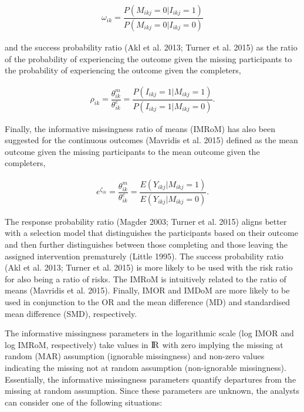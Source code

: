 \[\begin{aligned}
\omega_{ik} = \dfrac{P(M_{ikj} = 0 | I_{ikj} = 1)}{P(M_{ikj} = 0 | I_{ikj} = 0)}
\end{aligned}\]

and the success probability ratio (Akl et al. 2013; Turner et al. 2015) as the ratio of the
probability of experiencing the outcome given the missing participants to the
probability of experiencing the outcome given the completers,

\[\begin{aligned}
\rho_{ik} = \dfrac{\theta^{m}_{ik}}{\theta^{c}_{ik}} = \dfrac{P(I_{ikj} = 1 | M_{ikj} = 1)}{P(I_{ikj} = 1 | M_{ikj} = 0)}.
\end{aligned}\]

Finally, the informative missingness ratio of means (IMRoM) has also been suggested
for the continuous outcomes (Mavridis et al. 2015) defined as the mean outcome given the
missing participants to the mean outcome given the completers,

\[\begin{aligned}
e^{\zeta_{ik}} = \dfrac{\theta^{m}_{ik}}{\theta^{c}_{ik}} = \dfrac{E(Y_{ikj} | M_{ikj} = 1)}{E(Y_{ikj} | M_{ikj} = 0)}.
\end{aligned}\]

The response probability ratio (Magder 2003; Turner et al. 2015) aligns better with a
selection model that distinguishes the participants based on their outcome and
then further distinguishes between those completing and those leaving the assigned
intervention prematurely (Little 1995). The success probability ratio (Akl et al. 2013; Turner et al. 2015) is more likely to be used with the risk ratio for also being a ratio
of risks. The IMRoM is intuitively related to the ratio of means (Mavridis et al. 2015).
Finally, IMOR and IMDoM are more likely to be used in conjunction to the OR and
the mean difference (MD) and standardised mean difference (SMD), respectively.

The informative missingness parameters in the logarithmic
scale (log IMOR and log IMRoM, respectively) take values in \({\rm I\!R}\) with zero
implying the missing at random (MAR) assumption (ignorable missingness) and non-zero
values indicating the missing not at random assumption (non-ignorable missingness).
Essentially, the informative missingness parameters quantify departures from the
missing at random assumption. Since these parameters are unknown, the analysts can
consider one of the following situations:

